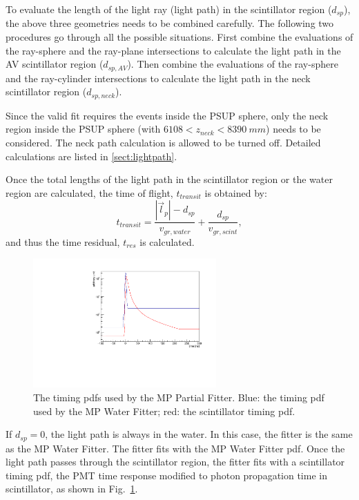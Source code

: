 To evaluate the length of the light ray (light path) in the scintillator region ($d_{sp}$), the above three geometries needs to be combined carefully. The following two procedures go through all the possible situations. First combine the evaluations of the ray-sphere and the ray-plane intersections to calculate the light path in the AV scintillator region ($d_{sp,AV}$). Then combine the evaluations of the ray-sphere and the ray-cylinder intersections to calculate the light path in the neck scintillator region ($d_{sp,neck}$).

Since the valid fit requires the events inside the PSUP sphere, only the neck region inside the PSUP sphere (with $6108<z_{neck}<8390~mm$) needs to be considered. The neck path calculation is allowed to be turned off. Detailed calculations are listed in \ref{sect:lightpath}.

Once the total lengths of the light path in the scintillator region or the water region are calculated, the time of flight, $t_{transit}$ is obtained by:
\begin{equation}
t_{transit} = \frac{|\vec{l}_p|-d_{sp}}{v_{gr,water}} +\frac{d_{sp}}{v_{gr,scint}},
\end{equation}
and thus the time residual, $t_{res}$ is calculated.

\begin{figure}[htbp]
	\centering	
	\includegraphics[width=7cm]{scintpdf.pdf}
	\caption{The timing pdfs used by the MP Partial Fitter. Blue: the timing pdf used by the MP Water Fitter; red: the scintillator timing pdf.}
	\label{partialpdf}
\end{figure}

If $d_{sp}=0$, the light path is always in the water. In this case, the fitter is the same as the MP Water Fitter. The fitter fits with the MP Water Fitter pdf. Once the light path passes through the scintillator region, the fitter fits with a scintillator timing pdf, the PMT time response modified to photon propagation time in scintillator, as shown in Fig.~\ref{partialpdf}.

